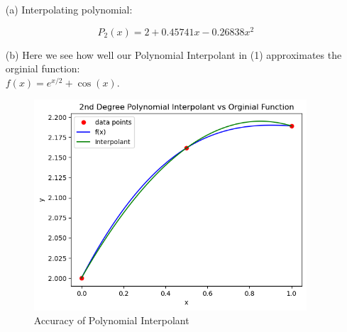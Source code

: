 \documentclass{article}
\begin{document}
\begin{enumerate}

    \item[(a)]  Interpolating polynomial:

                \begin{equation}
                    P_{2}(x) = 2 + 0.45741x - 0.26838x^{2}
                \end{equation}

                \vspace{10pt}

    \item[(b)]  Here we see how well our Polynomial Interpolant in (1) approximates the orginial function:\\ $f(x)=e^{x/2}+\cos(x)$.

                \begin{figure}[h]
                \centering
                \includegraphics[width=4in]{./Quest2b.png}
                \caption{Accuracy of Polynomial Interpolant}
                \label{fig:image2}
                \end{figure}
            
                \vspace{10pt}


\end{enumerate}
\end{document}
